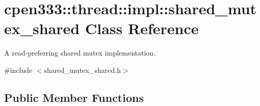 \hypertarget{classcpen333_1_1thread_1_1impl_1_1shared__mutex__shared}{}\section{cpen333\+:\+:thread\+:\+:impl\+:\+:shared\+\_\+mutex\+\_\+shared Class Reference}
\label{classcpen333_1_1thread_1_1impl_1_1shared__mutex__shared}


A read-\/preferring shared mutex implementation.  




{\ttfamily \#include $<$shared\+\_\+mutex\+\_\+shared.\+h$>$}

\subsection*{Public Member Functions}
